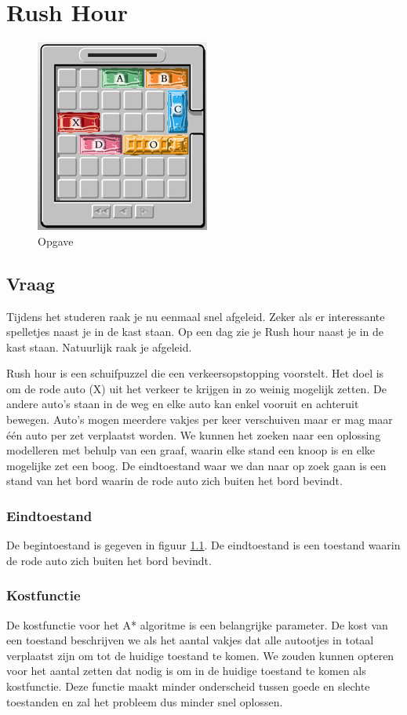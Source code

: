 \documentclass[alternative-exam.tex]{subfiles}
\begin{document}
\chapter{Rush Hour}
\begin{figure}[H]
\label{rushour}
\caption{Opgave}
\begin{center}
\includegraphics[scale=1.25]{resources/pictures/rushhour.jpg}
\end{center}
\end{figure}

\section{Vraag}
Tijdens het studeren raak je nu eenmaal snel afgeleid. Zeker als er interessante spelletjes naast je in de kast staan. Op een dag zie je Rush hour naast je in de kast staan. Natuurlijk raak je afgeleid.

Rush hour is een schuifpuzzel die een verkeersopstopping voorstelt. Het doel is om de rode auto (X) uit het verkeer te krijgen in zo weinig mogelijk zetten. De andere auto's staan in de weg en elke auto kan enkel vooruit en achteruit bewegen. Auto's mogen meerdere vakjes per keer verschuiven maar er mag maar \'e\'en auto per zet verplaatst worden.
We kunnen het zoeken naar een oplossing modelleren met behulp van een graaf, waarin elke stand een knoop is en elke mogelijke zet een boog. De eindtoestand waar we dan naar op zoek gaan is een stand van het bord waarin de rode auto zich buiten het bord bevindt.

\subsection{Eindtoestand} De begintoestand is gegeven in figuur \ref{rushour}. De eindtoestand is een toestand waarin de rode auto zich buiten het bord bevindt. 

\subsection{Kostfunctie}De kostfunctie voor het A* algoritme is een belangrijke parameter. De kost van een toestand beschrijven we als het aantal vakjes dat alle autootjes in totaal verplaatst zijn om tot de huidige toestand te komen. We zouden kunnen opteren voor het aantal zetten dat nodig is om in de huidige toestand te komen als kostfunctie. Deze functie maakt minder onderscheid tussen goede en slechte toestanden en zal het probleem dus minder snel oplossen.
\end{document}
